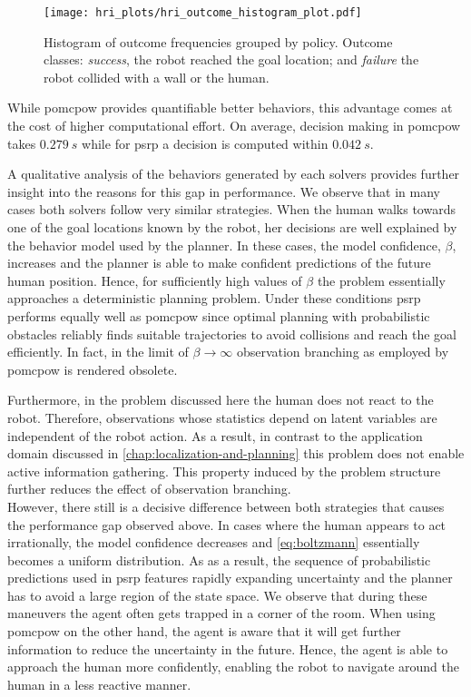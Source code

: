 \begin{figure}[H]
  \centering
  \texttt{[image: hri\_plots/hri\_outcome\_histogram\_plot.pdf]}
  \caption{Histogram of outcome frequencies grouped by policy. Outcome classes:
  \emph{success}, the robot reached the goal location; and \emph{failure} the
  robot collided with a wall or the human.}
  \label{fig:hri_outcome_histogram}
\end{figure}

While \ac{pomcpow} provides quantifiable better behaviors, this advantage comes
at the cost of higher computational effort. On average, decision making in
\ac{pomcpow} takes $\SI{0.279}{s}$ while for \ac{psrp} a decision is computed
within $\SI{0.042}{s}$.

A qualitative analysis of the behaviors generated by each solvers provides
further insight into the reasons for this gap in performance. We observe that
in many cases both solvers follow very similar strategies. When the human walks
towards one of the goal locations known by the robot, her decisions are well
explained by the behavior model used by the planner. In these cases, the model
confidence, $\beta$, increases and the planner is able to make confident
predictions of the future human position. Hence, for sufficiently high values
of $\beta$ the problem essentially approaches a deterministic planning problem.
Under these conditions \ac{psrp} performs equally well as \ac{pomcpow} since
optimal planning with probabilistic obstacles reliably finds suitable
trajectories to avoid collisions and reach the goal efficiently. In fact, in
the limit of $\beta \to \infty$ observation branching as employed by
\ac{pomcpow} is rendered obsolete.

Furthermore, in the problem discussed here the human does not react to the
robot. Therefore, observations whose statistics depend on latent variables are
independent of the robot action. As a result, in contrast to the application
domain discussed in \cref{chap:localization-and-planning} this problem does not
enable active information gathering. This property induced by the problem
structure further reduces the effect of observation branching.\\ However, there
still is a decisive difference between both strategies that causes the
performance gap observed above. In cases where the human appears to act
irrationally, the model confidence decreases and \cref{eq:boltzmann} essentially
becomes a uniform distribution. As as a result, the sequence of probabilistic
predictions used in \ac{psrp} features rapidly expanding uncertainty and the
planner has to avoid a large region of the state space. We observe that during
these maneuvers the agent often gets trapped in a corner of the room. When
using \ac{pomcpow} on the other hand, the agent is aware that it will get
further information to reduce the uncertainty in the future. Hence, the agent
is able to approach the human more confidently, enabling the robot to navigate
around the human in a less reactive manner.

